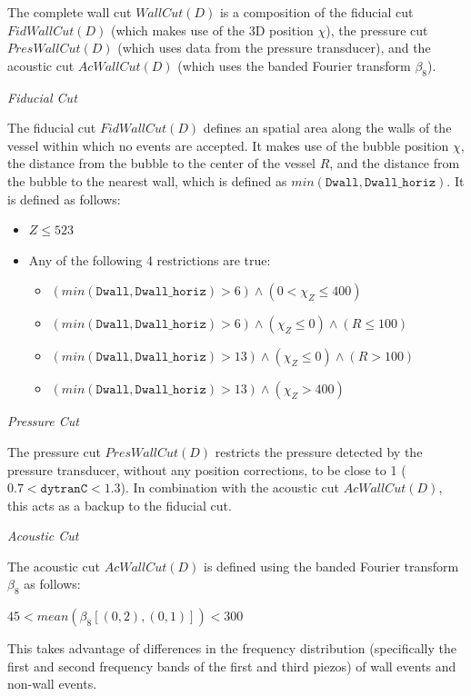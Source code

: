 \documentclass[10pt]{article}
\begin{document}
The complete wall cut $WallCut(D)$ is a composition of the fiducial cut $FidWallCut(D)$ (which makes use of the 3D position $\chi$), the pressure cut $PresWallCut(D)$ (which uses data from the pressure transducer), and the acoustic cut $AcWallCut(D)$ (which uses the banded Fourier transform $\beta _{8}$).

\textit{Fiducial Cut}

The fiducial cut $FidWallCut(D)$ defines an spatial area along the walls of the vessel within which no events are accepted. It makes use of the bubble position $\chi$, the distance from the bubble to the center of the vessel $R$, and the distance from the bubble to the nearest wall, which is defined as $min(\texttt{Dwall}, \texttt{Dwall\_horiz})$. It is defined as follows:

\begin{itemize}
    \item $Z \leq 523$
    \item Any of the following 4 restrictions are true:
    \begin{itemize}
        \item $(min(\texttt{Dwall}, \texttt{Dwall\_horiz}) > 6) \land (0 < \chi_{Z} \leq 400)$
        \item $(min(\texttt{Dwall}, \texttt{Dwall\_horiz}) > 6) \land (\chi_{Z} \leq 0) \land (R \leq 100)$
        \item $(min(\texttt{Dwall}, \texttt{Dwall\_horiz}) > 13) \land (\chi_{Z} \leq 0) \land (R > 100)$
        \item $(min(\texttt{Dwall}, \texttt{Dwall\_horiz}) > 13) \land (\chi_{Z} > 400)$
    \end{itemize}
\end{itemize}

\textit{Pressure Cut}

The pressure cut $PresWallCut(D)$ restricts the pressure detected by the pressure transducer, without any position corrections, to be close to 1 ($0.7<\texttt{dytranC}<1.3$). In combination with the acoustic cut $AcWallCut(D)$, this acts as a backup to the fiducial cut.

\textit{Acoustic Cut}

The acoustic cut $AcWallCut(D)$ is defined using the banded Fourier transform $\beta_{8}$ as follows:

$45 < mean(\beta_{8}[(0, 2), (0, 1)]) < 300$

This takes advantage of differences in the frequency distribution (specifically the first and second frequency bands of the first and third piezos) of wall events and non-wall events.
\end{document}
